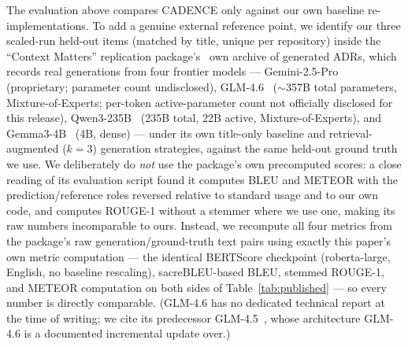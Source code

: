 \documentclass[preprint,12pt,authoryear]{elsarticle}
\renewcommand{\_}{\textunderscore\allowbreak{}}
\begin{document}
The evaluation above compares CADENCE only against our own baseline re-implementations. To add a genuine external reference point, we identify our three scaled-run held-out items (matched by title, unique per repository) inside the ``Context Matters'' replication package's~\citep{contextmatters-zenodo} own archive of generated ADRs, which records real generations from four frontier models --- Gemini-2.5-Pro~\citep{gemini25} (proprietary; parameter count undisclosed), GLM-4.6~\citep{glm45} ($\sim$357B total parameters, Mixture-of-Experts; per-token active-parameter count not officially disclosed for this release), Qwen3-235B~\citep{qwen3} (235B total, 22B active, Mixture-of-Experts), and Gemma3-4B~\citep{gemma3} (4B, dense) --- under its own title-only baseline and retrieval-augmented ($k=3$) generation strategies, against the same held-out ground truth we use. We deliberately do \emph{not} use the package's own precomputed scores: a close reading of its evaluation script found it computes BLEU and METEOR with the prediction/reference roles reversed relative to standard usage and to our own code, and computes ROUGE-1 without a stemmer where we use one, making its raw numbers incomparable to ours. Instead, we recompute all four metrics from the package's raw generation/ground-truth text pairs using exactly this paper's own metric computation --- the identical BERTScore checkpoint (roberta-large, English, no baseline rescaling), sacreBLEU-based BLEU, stemmed ROUGE-1, and METEOR computation on both sides of Table~\ref{tab:published} --- so every number is directly comparable. (GLM-4.6 has no dedicated technical report at the time of writing; we cite its predecessor GLM-4.5~\citep{glm45}, whose architecture GLM-4.6 is a documented incremental update over.)
\end{document}
